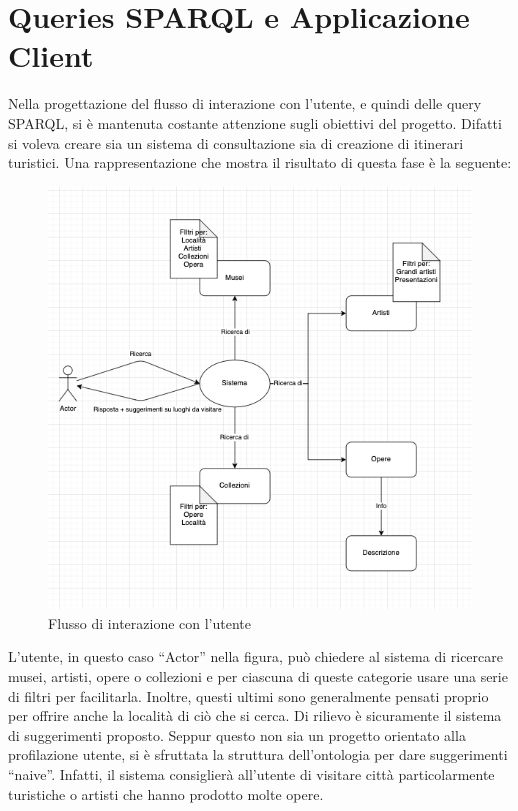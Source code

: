 \documentclass[12pt]{article}
\begin{document}
\section{Queries SPARQL e Applicazione Client}
Nella progettazione del flusso di interazione con l’utente, e quindi delle query SPARQL, si è mantenuta costante attenzione sugli obiettivi del progetto. Difatti si voleva creare sia un sistema di consultazione sia di creazione di itinerari turistici. 
Una rappresentazione che mostra il risultato di questa fase è la seguente:
\begin{figure}[!h]
   \centering
   \includegraphics[scale=0.6]{fig/flowchart interazione.png}
   \caption{Flusso di interazione con l'utente}\label{fig:picture}
\end{figure}

L’utente, in questo caso “Actor” nella figura, può chiedere al sistema di ricercare musei, artisti, opere o collezioni e per ciascuna di queste categorie usare una serie di filtri per facilitarla. Inoltre, questi ultimi sono generalmente pensati proprio per offrire anche la località di ciò che si cerca. Di rilievo è sicuramente il sistema di suggerimenti proposto. Seppur questo non sia un progetto orientato alla profilazione utente, si è sfruttata la struttura dell’ontologia per dare suggerimenti “naive”. Infatti, il sistema consiglierà all’utente di visitare città particolarmente turistiche o artisti che hanno prodotto molte opere.
\end{document}

